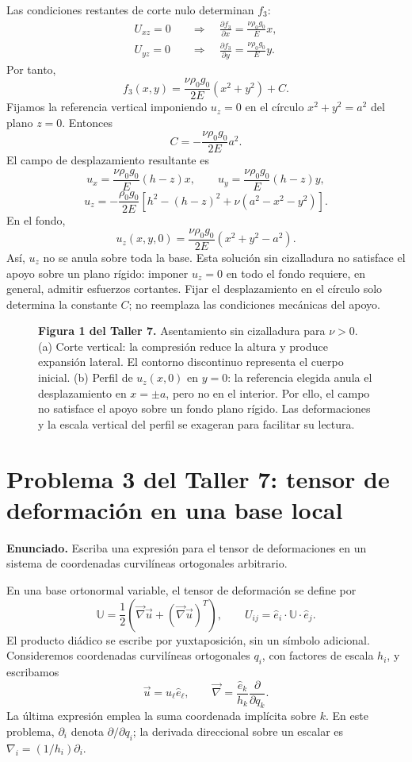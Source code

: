 Las condiciones restantes de corte nulo determinan $f_3$:
\[
\begin{aligned}
U_{xz}=0
&\quad\Longrightarrow\quad
\frac{\partial f_3}{\partial x}=\frac{\nu\rho_0g_0}{E}x,\\
U_{yz}=0
&\quad\Longrightarrow\quad
\frac{\partial f_3}{\partial y}=\frac{\nu\rho_0g_0}{E}y.
\end{aligned}
\]
Por tanto,
\[
f_3(x,y)=\frac{\nu\rho_0g_0}{2E}(x^2+y^2)+C.
\]
Fijamos la referencia vertical imponiendo $u_z=0$ en el círculo $x^2+y^2=a^2$ del plano $z=0$. Entonces
\[
C=-\frac{\nu\rho_0g_0}{2E}a^2.
\]
El campo de desplazamiento resultante es
\[
\boxed{u_x=\frac{\nu\rho_0g_0}{E}(h-z)x},
\qquad
\boxed{u_y=\frac{\nu\rho_0g_0}{E}(h-z)y},
\]
\[
\boxed{u_z=-\frac{\rho_0g_0}{2E}
\left[h^2-(h-z)^2+\nu(a^2-x^2-y^2)\right]}.
\]
En el fondo,
\[
u_z(x,y,0)=\frac{\nu\rho_0g_0}{2E}(x^2+y^2-a^2).
\]
Así, $u_z$ no se anula sobre toda la base. Esta solución sin cizalladura no satisface el apoyo sobre un plano rígido: imponer $u_z=0$ en todo el fondo requiere, en general, admitir esfuerzos cortantes. Fijar el desplazamiento en el círculo solo determina la constante $C$; no reemplaza las condiciones mecánicas del apoyo.


\begin{figure}[H]
\centering

\par\medskip
\begin{minipage}{\textwidth}
\textbf{Figura 1 del Taller 7.} Asentamiento sin cizalladura para $\nu>0$. (a) Corte vertical: la compresión reduce la altura y produce expansión lateral. El contorno discontinuo representa el cuerpo inicial. (b) Perfil de $u_z(x,0)$ en $y=0$: la referencia elegida anula el desplazamiento en $x=\pm a$, pero no en el interior. Por ello, el campo no satisface el apoyo sobre un fondo plano rígido. Las deformaciones y la escala vertical del perfil se exageran para facilitar su lectura.
\end{minipage}
\end{figure}

\section{Problema 3 del Taller 7: tensor de deformación en una base local}

\textbf{Enunciado.} Escriba una expresión para el tensor de deformaciones en un sistema de coordenadas curvilíneas ortogonales arbitrario.

En una base ortonormal variable, el tensor de deformación se define por
\[
\mathbb U=\frac{1}{2}
\left(\vec\nabla\vec u+(\vec\nabla\vec u)^T\right),
\qquad
U_{ij}=\hat e_i\cdot\mathbb U\cdot\hat e_j.
\]
El producto diádico se escribe por yuxtaposición, sin un símbolo adicional. Consideremos coordenadas curvilíneas ortogonales $q_i$, con factores de escala $h_i$, y escribamos
\[
\vec u=u_\ell\hat e_\ell,
\qquad
\vec\nabla=\frac{\hat e_k}{h_k}\frac{\partial}{\partial q_k}.
\]
La última expresión emplea la suma coordenada implícita sobre $k$. En este problema, $\partial_i$ denota $\partial/\partial q_i$; la derivada direccional sobre un escalar es $\nabla_i=(1/h_i)\partial_i$.

